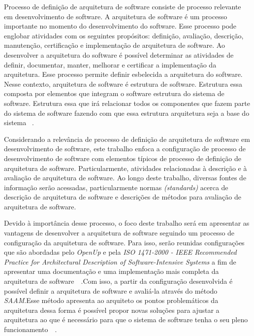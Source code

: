 Processo de definição de arquitetura de software consiste de processo relevante em desenvolvimento de software. A arquitetura de software é um processo importante no momento do desenvolvimento do software. Esse processo pode englobar atividades com os seguintes propósitos: definição, avaliação, descrição, manutenção, certificação e implementação de arquitetura de software. Ao desenvolver a arquitetura do software é possível determinar as atividades de definir, documentar, manter, melhorar e certificar a implementação da arquitetura. Esse processo permite definir esbelecida a arquitetura do software. Nesse contexto, arquitetura de software é estrutura de software. Estrutura essa composta por elementos que integram o software estrutura do sistema de software. Estrutura essa que irá relacionar todos os componentes que fazem parte do sistema de software fazendo com que essa estrutura arquitetura seja a base do sistema 
~\cite{ISO_1471}.

Considerando a relevância de processo de definição de arquitetura de software em desenvolvimento de software, este trabalho enfoca a configuração de processo de desenvolvimento de software com elementos típicos de processo de definição de arquitetura de software. Particularmente, atividades relacionadas à descrição e à avaliação de arquitetura de software. Ao longo deste trabalho, diversas fontes de informação serão acessadas, particularmente normas \emph{(standards)} acerca de descrição de arquitetura de software e descrições de métodos para avaliação de arquitetura de software.


Devido à importância desse processo, o foco deste trabalho será em apresentar as vantagens de desenvolver a arquitetura de software seguindo um processo de configuração da arquitetura de software. Para isso, serão reunidas configurações que são abordadas pelo \emph{\acrfull{OpenUp}} e pela \emph{ISO 1471-2000 - IEEE Recommended Practice for Architectural Description of Software-Intensive Systems} a fim de apresentar uma documentação e uma implementação mais completa da arquitetura de software~\cite{ISO_1471}~\cite{openup}.Com isso, a partir da configuração desenvolvida é possível definir a arquitetura de software e avaliá-la através do método \emph{\acrfull{SAAM}}.Esse método apresenta ao arquiteto os pontos problemáticos da arquitetura dessa forma é possível propor novas soluções para ajustar a arquitetura ao que é necessário para que o sistema de software tenha o seu pleno funcionamento~\cite{survey_methods}~\cite{scenario_methods}.

